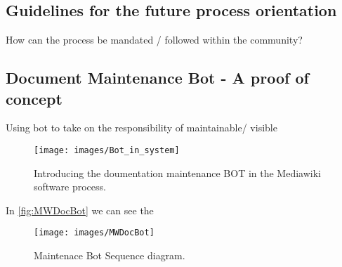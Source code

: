 \subsection{Guidelines for the future process orientation}
How can the process be mandated / followed within the community?

\subsection{Document Maintenance Bot - A proof of concept}

Using bot to take on the responsibility of 
maintainable/ visible

\begin{figure}[H]
  \centering
  \texttt{[image: images/Bot\_in\_system]}
  \caption[Introducing the doumentation maintenance BOT in the Mediawiki software process]{Introducing the doumentation maintenance BOT in the Mediawiki software process.}\label{fig:/Bot_in_system}
\end{figure}

In \autoref{fig:MWDocBot}  we can see the 
\begin{figure}[H]
  \centering
  \texttt{[image: images/MWDocBot]}
  \caption[Maintenace Bot Sequence diagram]{Maintenace Bot Sequence diagram.}\label{fig:MWDocBot}
\end{figure}